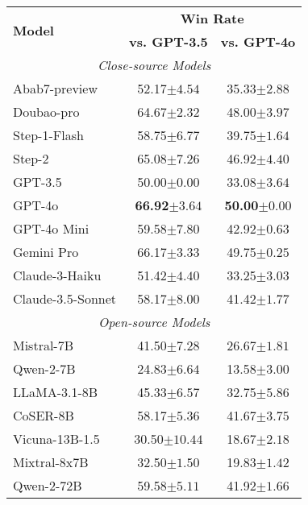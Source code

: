 
\begin{table}[htbp]
\centering
\setlength{\tabcolsep}{3pt}
\renewcommand{\arraystretch}{0.9}
{\small
\begin{tabular}{lcc}
\toprule
\multirow{2}{*}{\textbf{Model}} & \multicolumn{2}{c}{\textbf{Win Rate}} \\ \cmidrule(lr){2-3} & \textbf{vs. GPT-3.5} & \textbf{vs. GPT-4o} \\
\midrule
\multicolumn{3}{c}{\textit{Close-source Models}} \\
\midrule
Abab7-preview & 52.17\scriptsize{$\pm4.54$} & 35.33\scriptsize{$\pm2.88$} \\
Doubao-pro & 64.67\scriptsize{$\pm2.32$} & 48.00\scriptsize{$\pm3.97$} \\
Step-1-Flash & 58.75\scriptsize{$\pm6.77$} & 39.75\scriptsize{$\pm1.64$} \\
Step-2 & 65.08\scriptsize{$\pm7.26$} & 46.92\scriptsize{$\pm4.40$} \\
GPT-3.5 & 50.00\scriptsize{$\pm0.00$} & 33.08\scriptsize{$\pm3.64$} \\
GPT-4o & \textbf{66.92\scriptsize{$\pm3.64$}} & \textbf{50.00\scriptsize{$\pm0.00$}} \\
GPT-4o Mini & 59.58\scriptsize{$\pm7.80$} & 42.92\scriptsize{$\pm0.63$} \\
Gemini Pro & 66.17\scriptsize{$\pm3.33$} & 49.75\scriptsize{$\pm0.25$} \\
Claude-3-Haiku & 51.42\scriptsize{$\pm4.40$} & 33.25\scriptsize{$\pm3.03$} \\
Claude-3.5-Sonnet & 58.17\scriptsize{$\pm8.00$} & 41.42\scriptsize{$\pm1.77$} \\
\midrule
\multicolumn{3}{c}{\textit{Open-source Models}} \\
\midrule
Mistral-7B & 41.50\scriptsize{$\pm7.28$} & 26.67\scriptsize{$\pm1.81$} \\
Qwen-2-7B & 24.83\scriptsize{$\pm6.64$} & 13.58\scriptsize{$\pm3.00$} \\
LLaMA-3.1-8B & 45.33\scriptsize{$\pm6.57$} & 32.75\scriptsize{$\pm5.86$} \\
CoSER-8B & 58.17\scriptsize{$\pm5.36$} & 41.67\scriptsize{$\pm3.75$} \\
Vicuna-13B-1.5 & 30.50\scriptsize{$\pm10.44$} & 18.67\scriptsize{$\pm2.18$} \\
Mixtral-8x7B & 32.50\scriptsize{$\pm1.50$} & 19.83\scriptsize{$\pm1.42$} \\
Qwen-2-72B & 59.58\scriptsize{$\pm5.11$} & 41.92\scriptsize{$\pm1.66$} \\

\end{tabular}}
\end{table}
